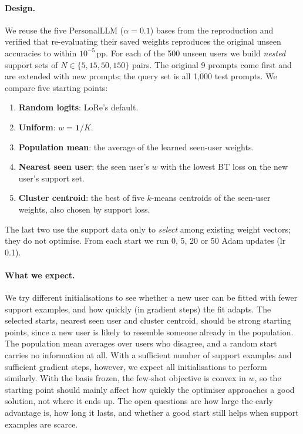 \documentclass[11pt,a4paper]{article}
\newcommand{\pp}{\,pp\xspace}
\begin{document}
\paragraph{Design.} We reuse the five PersonalLLM ($\alpha=0.1$) bases from the reproduction and verified
that re-evaluating their saved weights reproduces the original unseen accuracies to within $10^{-5}$\pp.
For each of the 500 unseen users we build \emph{nested} support sets of $N\in\{5,15,50,150\}$ pairs. The
original 9 prompts come first and are extended with new prompts; the query set is all 1{,}000 test
prompts. We compare five starting points:
\begin{enumerate}[label=\arabic*.]
\item \textbf{Random logits}: LoRe's default.
\item \textbf{Uniform}: $w=\mathbf{1}/K$.
\item \textbf{Population mean}: the average of the learned seen-user weights.
\item \textbf{Nearest seen user}: the seen user's $w$ with the lowest BT loss on the new user's support set.
\item \textbf{Cluster centroid}: the best of five $k$-means centroids of the seen-user weights, also
chosen by support loss.
\end{enumerate}
The last two use the support data only to \emph{select} among existing weight vectors; they do not
optimise. From each start we run 0, 5, 20 or 50 Adam updates (lr 0.1).

\paragraph{What we expect.} We try different initialisations to see whether a new user can be fitted
with fewer support examples, and how quickly (in gradient steps) the fit adapts. The selected starts,
nearest seen user and cluster centroid, should be strong starting points, since a new user is likely to
resemble someone already in the population. The population mean averages over users who disagree, and
a random start carries no information at all. With a sufficient number of support examples and
sufficient gradient steps, however, we expect all initialisations to perform similarly. With the basis
frozen, the few-shot objective is convex in $w$, so the starting point should mainly affect how quickly
the optimiser approaches a good solution, not where it ends up. The open questions are how large the
early advantage is, how long it lasts, and whether a good start still helps when support examples are scarce.
\end{document}

